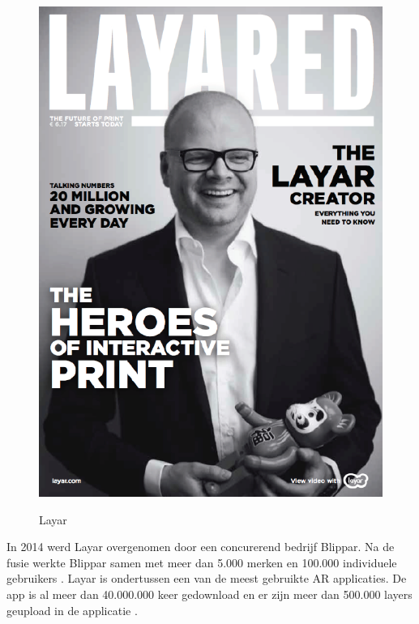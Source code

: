 \documentclass[pdftex,a4paper,12pt,twoside]{report}
\begin{document}
\begin{figure}
\vspace{-30pt}
\includegraphics[scale=0.35]{layar}
\label{fig:layar}
\caption{Layar \citep{layarFoto}} \label{fig:layar}
\vspace{-30pt}
\end{figure}


In 2014 werd Layar overgenomen door een concurerend bedrijf Blippar. Na de fusie werkte Blippar samen met meer dan 5.000 merken en 100.000 individuele gebruikers \citep{blippar}. Layar is ondertussen een van de meest gebruikte AR applicaties. De app is al meer dan 40.000.000 keer gedownload en er zijn meer dan 500.000 layers geupload in de applicatie \cite{layarnumbers}. 
\end{document}
